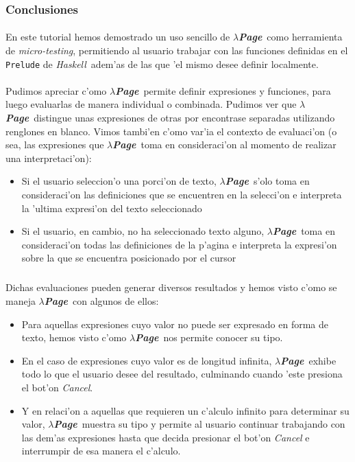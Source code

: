 \documentclass[a4paper]{article}
\newcommand{\haskell}{\textsl{Haskell}}
\newcommand{\hpage}{\textbf{\textsl{$\lambda$Page}}}
\begin{document}
\newpage
\subsubsection{Conclusiones}
\paragraph{}En este tutorial hemos demostrado un uso sencillo de \hpage\ como herramienta de \textsl{micro-testing}, permitiendo al usuario trabajar con las funciones definidas en el \texttt{Prelude} de \haskell\ adem'as de las que 'el mismo desee definir localmente.
\paragraph{}Pudimos apreciar c'omo \hpage\ permite definir expresiones y funciones, para luego evaluarlas de manera individual o combinada.  Pudimos ver que \hpage\ distingue unas expresiones de otras por encontrase separadas utilizando renglones en blanco.  Vimos tambi'en c'omo var'ia el contexto de evaluaci'on (o sea, las expresiones que \hpage\ toma en consideraci'on al momento de realizar una interpretaci'on):
\begin{itemize}
	\item Si el usuario seleccion'o una porci'on de texto, \hpage\ s'olo toma en consideraci'on las definiciones que se encuentren en la selecci'on e interpreta la 'ultima expresi'on del texto seleccionado
	\item Si el usuario, en cambio, no ha seleccionado texto alguno, \hpage\ toma en consideraci'on todas las definiciones de la p'agina e interpreta la expresi'on sobre la que se encuentra posicionado por el cursor
\end{itemize}
\subparagraph{}Dichas evaluaciones pueden generar diversos resultados y hemos visto c'omo se maneja \hpage\ con algunos de ellos:
\begin{itemize}
	\item Para aquellas expresiones cuyo valor no puede ser expresado en forma de texto, hemos visto c'omo \hpage\ nos permite conocer su tipo.
	\item En el caso de expresiones cuyo valor es de longitud infinita, \hpage\ exhibe todo lo que el usuario desee del resultado, culminando cuando 'este presiona el bot'on \textsl{Cancel}.
	\item Y en relaci'on a aquellas que requieren un c'alculo infinito para determinar su valor, \hpage\ muestra su tipo y permite al usuario continuar trabajando con las dem'as expresiones hasta que decida presionar el bot'on \textsl{Cancel} e interrumpir de esa manera el c'alculo.
\end{itemize}
\end{document}
